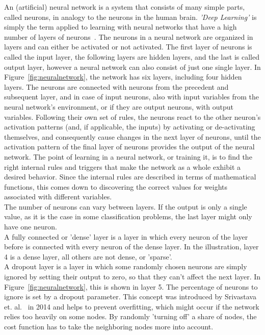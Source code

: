 \documentclass[
a4paper,
pagesize,
pdftex,
12pt,
twoside, %
BCOR=5mm, %
ngerman,
fleqn,
final,
]{scrartcl}
\begin{document}
	An (artificial) neural network is a system that consists of many simple parts, called neurons, in analogy to the neurons in the human brain. \textit{'Deep Learning'} is simply the term applied to learning with neural networks that have a high number of layers of neurons~\cite{Nielsen.2015}. The neurons in a neural network are organized in layers and can either be activated or not activated. The first layer of neurons is called the input layer, the following layers are hidden layers, and the last is called output layer, however a neural network can also consist of just one single layer. In Figure~\ref{fig:neuralnetwork}, the network has six layers, including four hidden layers. The neurons are connected with neurons from the precedent and subsequent layer, and in case of input neurons, also with input variables from the neural network's environment, or if they are output neurons, with output variables. Following their own set of rules, the neurons react to the other neuron's activation patterns (and, if applicable, the inputs) by activating or de-activating themselves, and consequently cause changes in the next layer of neurons, until the activation pattern of the final layer of neurons provides the output of the neural network. The point of learning in a neural network, or training it, is to find the right internal rules and triggers that make the network as a whole exhibit a desired behavior. Since the internal rules are described in terms of mathematical functions, this comes down to discovering the correct values for weights associated with different variables.\\
	The number of neurons can vary between layers. If the output is only a single value, as it is the case in some classification problems, the last layer might only have one neuron.\\
	A fully connected or 'dense' layer is a layer in which every neuron of the layer before is connected with every neuron of the dense layer. In the illustration, layer 4 is a dense layer, all others are not dense, or 'sparse'.\\
	A dropout layer is a layer in which some randomly chosen neurons are simply ignored by setting their output to zero, so that they can't affect the next layer. In Figure~\ref{fig:neuralnetwork}, this is shown in layer 5. The percentage of neurons to ignore is set by a dropout parameter. This concept was introduced by Srivastava et. al.~\cite{Srivastava.2014} in 2014 and helps to prevent overfitting, which might occur if the network relies too heavily on some nodes. By randomly 'turning off' a share of nodes, the cost function has to take the neighboring nodes more into account.\\
\end{document}
